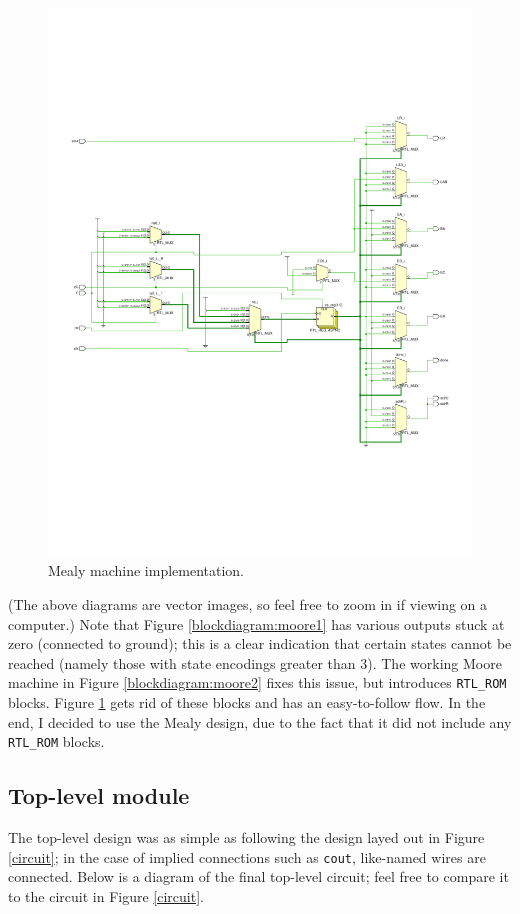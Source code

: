 \documentclass{article}
\renewcommand{\c}[1]{\texttt{#1}}
\begin{document}
\begin{figure}[H]
    \centering
    \includegraphics[width=\textwidth]{Images/schematic_final}
    \caption{Mealy machine implementation.}
    \label{blockdiagram:mealy}
\end{figure}

(The above diagrams are vector images, so feel free to zoom
in if viewing on a computer.)
Note that Figure \ref{blockdiagram:moore1} has various outputs
stuck at zero (connected to ground);
this is a clear indication that certain states
cannot be reached (namely those with state encodings greater
than 3). The working Moore machine in Figure
\ref{blockdiagram:moore2} fixes this issue, but introduces
\c{RTL\_ROM} blocks. Figure \ref{blockdiagram:mealy} gets
rid of these blocks and has an easy-to-follow
flow. In the end, I decided to use the Mealy design,
due to the fact that it did not include any \c{RTL\_ROM}
blocks.

\subsection{Top-level module} The top-level design was as
simple as following the design layed out in Figure
\ref{circuit}; in the case of implied connections such as
\c{cout}, like-named wires are connected. Below is
a diagram of the final top-level circuit; feel free to
compare it to the circuit in Figure \ref{circuit}.
\end{document}
